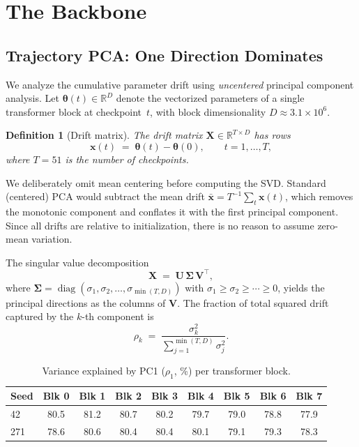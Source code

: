 \documentclass[11pt,a4paper]{article}
\DeclareMathOperator{\diag}{diag}
\newcommand{\R}{\mathbb{R}}
\newtheorem{definition}{Definition}
\begin{document}
\section{The Backbone}\label{sec:backbone}

\subsection{Trajectory PCA: One Direction Dominates}\label{sec:pca}

We analyze the cumulative parameter drift using \emph{uncentered} principal
component analysis.  Let $\bm{\theta}(t) \in \R^D$ denote the vectorized
parameters of a single transformer block at checkpoint~$t$, with block
dimensionality $D \approx 3.1 \times 10^6$.

\begin{definition}[Drift matrix]
    The drift matrix $\mathbf{X} \in \R^{T \times D}$ has rows
    \begin{equation}\label{eq:drift}
        \mathbf{x}(t) \;=\; \bm{\theta}(t) - \bm{\theta}(0),
        \qquad t = 1,\ldots,T,
    \end{equation}
    where $T = 51$ is the number of checkpoints.
\end{definition}

We deliberately omit mean centering before computing the SVD.  Standard
(centered) PCA would subtract the mean drift
$\bar{\mathbf{x}} = T^{-1}\sum_t \mathbf{x}(t)$, which removes the monotonic
component and conflates it with the first principal component.  Since all drifts
are relative to initialization, there is no reason to assume zero-mean
variation.

The singular value decomposition
\begin{equation}\label{eq:svd}
    \mathbf{X} \;=\; \mathbf{U}\,\bm{\Sigma}\,\mathbf{V}^{\!\top},
\end{equation}
where $\bm{\Sigma} = \diag(\sigma_1, \sigma_2, \ldots, \sigma_{\min(T,D)})$
with $\sigma_1 \geq \sigma_2 \geq \cdots \geq 0$, yields the principal
directions as the columns of $\mathbf{V}$.  The fraction of total squared drift
captured by the $k$-th component is
\begin{equation}\label{eq:var-explained}
    \rho_k \;=\; \frac{\sigma_k^2}{\sum_{j=1}^{\min(T,D)} \sigma_j^2}.
\end{equation}

\begin{table}[t]
\centering
\caption{Variance explained by PC1 ($\rho_1$, \%) per transformer block.}
\label{tab:pca-variance}
\begin{tabular}{@{}lcccccccc@{}}
\toprule
\textbf{Seed} & \textbf{Blk 0} & \textbf{Blk 1} & \textbf{Blk 2} &
\textbf{Blk 3} & \textbf{Blk 4} & \textbf{Blk 5} & \textbf{Blk 6} &
\textbf{Blk 7} \\
\midrule
42  & 80.5 & 81.2 & 80.7 & 80.2 & 79.7 & 79.0 & 78.8 & 77.9 \\
271 & 78.6 & 80.6 & 80.4 & 80.4 & 80.1 & 79.1 & 79.3 & 78.3 \\
\bottomrule
\end{tabular}
\end{table}
\end{document}
